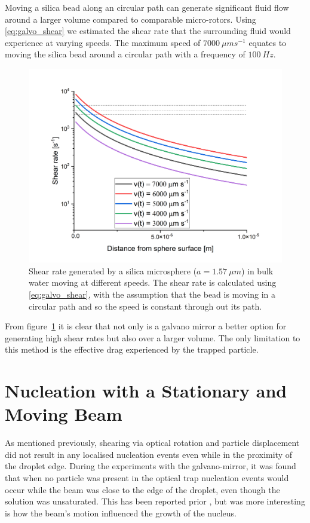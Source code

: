 Moving a silica bead along an circular path can generate significant fluid 
flow around a larger volume compared to comparable micro-rotors. Using \eqref{eq:galvo_shear} we estimated the shear rate that the surrounding fluid 
would experience at varying speeds. The maximum speed of $7000\ \mu m s^{-1}$
equates to moving the silica bead around a circular path with a frequency of 
$100\ Hz$.
\begin{figure}[h!]
	\centering
	\includegraphics[width=0.85\linewidth]{galvano_shear_rate.png}
	\caption{Shear rate generated by a silica microsphere ($a = 1.57\ \mu m$) 
		in bulk water moving at different speeds. The shear rate is calculated 
		using \eqref{eq:galvo_shear}, with the assumption that the bead is moving
		in a circular path and so the speed is constant through out its path.}
	\label{fig:galvano_shear}
\end{figure}

From figure~\ref{fig:galvano_shear} it is clear that not only is a galvano 
mirror a better option for generating high shear rates but also over a larger 
volume. The only limitation to this method is the effective drag experienced 
by the trapped particle. 
\section{Nucleation with a Stationary and Moving Beam}
As mentioned previously, shearing via optical rotation and particle displacement
did not result in any localised nucleation events even while in the proximity of 
the droplet edge. During the experiments with the galvano-mirror, it was found 
that when no particle was present in the optical trap nucleation events would 
occur while the beam was close to the edge of the droplet, even though the solution
was unsaturated. This has been reported prior \cite{Rungsimanon2010, Liao2022}, 
but was more interesting is how the beam's motion influenced the growth of the 
nucleus.

